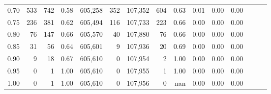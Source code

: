 \begin{tabular}{rrrrrrrrrrrrrrr}
0.70 &      533 &     742 &  0.58 &  605,258 &      352 &  107,352 &      604 &  0.63 &  0.01 &  0.00 &      0.00 \\
0.75 &      236 &     381 &  0.62 &  605,494 &      116 &  107,733 &      223 &  0.66 &  0.00 &  0.00 &      0.00 \\
0.80 &       76 &     147 &  0.66 &  605,570 &       40 &  107,880 &       76 &  0.66 &  0.00 &  0.00 &      0.00 \\
0.85 &       31 &      56 &  0.64 &  605,601 &        9 &  107,936 &       20 &  0.69 &  0.00 &  0.00 &      0.00 \\
0.90 &        9 &      18 &  0.67 &  605,610 &        0 &  107,954 &        2 &  1.00 &  0.00 &  0.00 &      0.00 \\
0.95 &        0 &       1 &  1.00 &  605,610 &        0 &  107,955 &        1 &  1.00 &  0.00 &  0.00 &      0.00 \\
1.00 &        0 &       1 &  1.00 &  605,610 &        0 &  107,956 &        0 &   nan &  0.00 &  0.00 &      0.00 \\
\bottomrule
\end{tabular}
